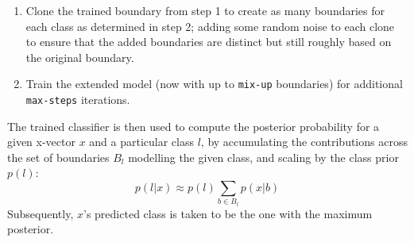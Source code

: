 \documentclass[bsc,frontabs,twoside,singlespacing,parskip,deptreport]{infthesis}
\begin{document}
{{{\begin{enumerate}
{$${               }{\textrm{number of boundaries for class }l}$$
        Notice how the \verb|power| parameter (when set to a value closer to 0) can effectively bring the class sizes closer together, thus causing the number of boundaries to vary less with class sizes. Values closer to 1.0 (or bigger), on the other hand, cause bigger classes to be modelled by many more boundaries than small classes.
        }
        \item {Clone the trained boundary from step 1 to create as many boundaries for each class as determined in step 2; adding some random noise to each clone to ensure that the added boundaries are distinct but still roughly based on the original boundary.}
        \item {Train the extended model (now with up to \verb|mix-up| boundaries) for additional \verb|max-steps| iterations.}
      \end{enumerate}

      The trained classifier is then used to compute the posterior probability for a given x-vector $x$ and a particular class $l$, by accumulating the contributions across the set of boundaries $B_l$ modelling the given class, and scaling by the class prior $p(l)$:
      \begin{equation}
        \label{eq:logit-posterior}
        p(l|x) \approx p(l)\sum_{b \in B_l} p(x|b)
      \end{equation}
      Subsequently, $x$'s predicted class is taken to be the one with the maximum posterior.

}}}
\end{document}
